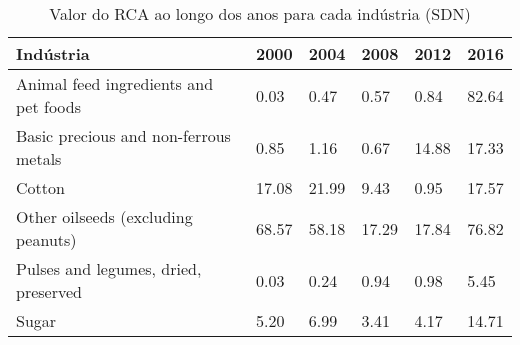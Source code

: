\begin{table}
\centering
\caption{Valor do RCA ao longo dos anos para cada indústria (SDN)}
\begin{tabular}{p{6cm}p{1.5cm}p{1.5cm}p{1.5cm}p{1.5cm}p{1.5cm}}
\toprule
                            Indústria &  2000 &  2004 &  2008 &  2012 &  2016 \\
\midrule
Animal feed ingredients and pet foods &  0.03 &  0.47 &  0.57 &  0.84 & 82.64 \\
Basic precious and non-ferrous metals &  0.85 &  1.16 &  0.67 & 14.88 & 17.33 \\
                               Cotton & 17.08 & 21.99 &  9.43 &  0.95 & 17.57 \\
   Other oilseeds (excluding peanuts) & 68.57 & 58.18 & 17.29 & 17.84 & 76.82 \\
 Pulses and legumes, dried, preserved &  0.03 &  0.24 &  0.94 &  0.98 &  5.45 \\
                                Sugar &  5.20 &  6.99 &  3.41 &  4.17 & 14.71 \\
\bottomrule
\end{tabular}
\end{table}
